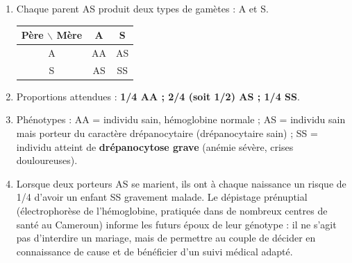 \documentclass[11pt]{article}
\begin{document}
\begin{corrige}
\begin{enumerate}
\item Chaque parent AS produit deux types de gamètes : A et S.
\begin{center}
\begin{tabular}{|c|c|c|}
\hline
\rowcolor{popblueL} Père $\backslash$ Mère & A & S \\
\hline
A & AA & AS \\
\hline
S & AS & SS \\
\hline
\end{tabular}
\end{center}
\item Proportions attendues : \textbf{1/4 AA ; 2/4 (soit 1/2) AS ; 1/4 SS}.
\item Phénotypes : AA = individu sain, hémoglobine normale ; AS = individu sain mais porteur du caractère drépanocytaire (drépanocytaire sain) ; SS = individu atteint de \textbf{drépanocytose grave} (anémie sévère, crises douloureuses).
\item Lorsque deux porteurs AS se marient, ils ont à chaque naissance un risque de 1/4 d'avoir un enfant SS gravement malade. Le dépistage prénuptial (électrophorèse de l'hémoglobine, pratiquée dans de nombreux centres de santé au Cameroun) informe les futurs époux de leur génotype : il ne s'agit pas d'interdire un mariage, mais de permettre au couple de décider en connaissance de cause et de bénéficier d'un suivi médical adapté.
\end{enumerate}
\end{corrige}
\end{document}
